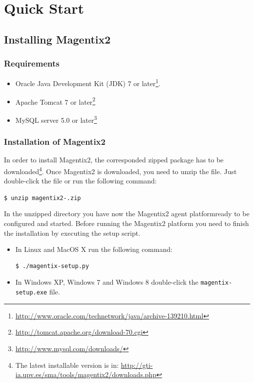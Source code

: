 \chapter{Quick Start} \label{chap:quickstart}
\section{Installing Magentix2} %
\subsection{Requirements}
\begin{itemize}
\item Oracle Java Development Kit (JDK) 7 or later\footnote{\url{http://www.oracle.com/technetwork/java/archive-139210.html}}. %
\item Apache Tomcat 7 or later\footnote{\url{http://tomcat.apache.org/download-70.cgi}}
\item MySQL server 5.0 or later\footnote{\url{http://www.mysql.com/downloads/}}
\end{itemize}


\subsection{Installation of Magentix2}

In order to install Magentix2,  the corresponded zipped package has to be downloaded\footnote{The latest installable version is in: \url{http://gti-ia.upv.es/sma/tools/magentix2/downloads.php}}. Once Magentix2 is downloaded, you need to unzip the file. Just double-click the file or run the following command:

\texttt{\$ unzip magentix2-\MagentixVersion.zip}

In the unzipped directory you have now the Magentix2 agent platform\texttrademark ready to be configured and started. Before running the Magentix2 platform you need to finish the installation by executing the setup script.
\begin{itemize}
    \item In Linux and MacOS X run the following command:
        \begin{verbatim}
$ ./magentix-setup.py
        \end{verbatim}
    \item In Windows XP, Windows 7 and Windows 8 double-click the \texttt{magentix-setup.exe} file.
\end{itemize}


